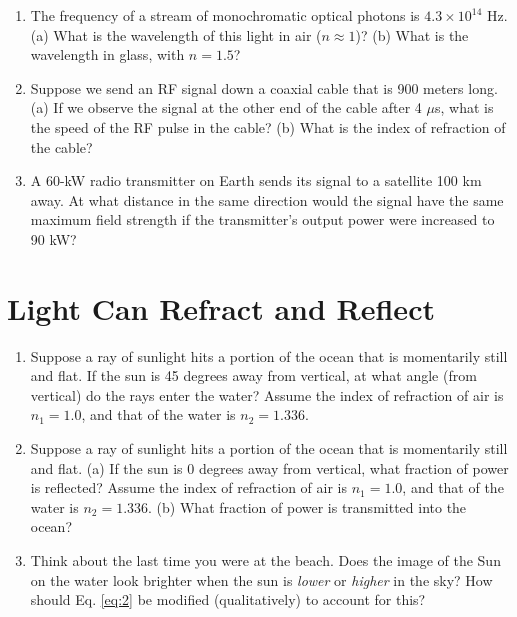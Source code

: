 \documentclass{article}
\begin{document}
\begin{enumerate}
\item The frequency of a stream of monochromatic optical photons is $4.3 \times 10^{14}$ Hz.  (a) What is the wavelength of this light in air ($n \approx 1$)?  (b) What is the wavelength in glass, with $n = 1.5$? \\ \vspace{2cm}
\item Suppose we send an RF signal down a coaxial cable that is 900 meters long.  (a) If we observe the signal at the other end of the cable after 4 $\mu$s, what is the speed of the RF pulse in the cable? (b) What is the index of refraction of the cable? \\ \vspace{2cm}
\item A 60-kW radio transmitter on Earth sends its signal to a satellite 100 km away.  At what distance in the same direction would the signal have the same maximum field strength if the transmitter’s output power were increased to 90 kW? \\ \vspace{2cm}
\end{enumerate}

\section{Light Can Refract and Reflect}

\begin{enumerate}
\item Suppose a ray of sunlight hits a portion of the ocean that is momentarily still and flat.  If the sun is 45 degrees away from vertical, at what angle (from vertical) do the rays enter the water?  Assume the index of refraction of air is $n_1 = 1.0$, and that of the water is $n_2 = 1.336$. \\ \vspace{3cm}
\item Suppose a ray of sunlight hits a portion of the ocean that is momentarily still and flat.  (a) If the sun is 0 degrees away from vertical, what fraction of power is reflected?  Assume the index of refraction of air is $n_1 = 1.0$, and that of the water is $n_2 = 1.336$. (b) What fraction of power is transmitted into the ocean? \\ \vspace{3cm}
\item Think about the last time you were at the beach.  Does the image of the Sun on the water look brighter when the sun is \textit{lower} or \textit{higher} in the sky?  How should Eq. \ref{eq:2} be modified (qualitatively) to account for this? \\ \vspace{2cm}
\end{enumerate}
\end{document}
